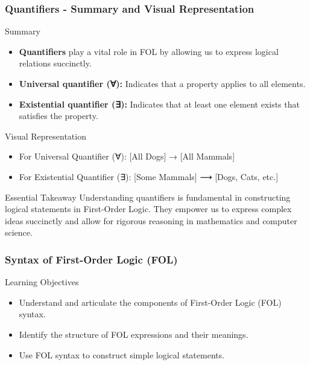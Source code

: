 \documentclass[aspectratio=169]{beamer}
\begin{document}
\begin{frame}[fragile]
    \frametitle{Quantifiers - Summary and Visual Representation}
    \begin{block}{Summary}
        \begin{itemize}
            \item \textbf{Quantifiers} play a vital role in FOL by allowing us to express logical relations succinctly.
            \item \textbf{Universal quantifier (∀):} Indicates that a property applies to all elements.
            \item \textbf{Existential quantifier (∃):} Indicates that at least one element exists that satisfies the property.
        \end{itemize}
    \end{block}

    \begin{block}{Visual Representation}
        \begin{itemize}
            \item For Universal Quantifier (∀): [All Dogs] → [All Mammals]
            \item For Existential Quantifier (∃): [Some Mammals] ⟶ [Dogs, Cats, etc.]
        \end{itemize}
    \end{block}

    \begin{block}{Essential Takeaway}
        Understanding quantifiers is fundamental in constructing logical statements in First-Order Logic. They empower us to express complex ideas succinctly and allow for rigorous reasoning in mathematics and computer science.
    \end{block}
\end{frame}

\begin{frame}[fragile]
    \frametitle{Syntax of First-Order Logic (FOL)}
    \begin{block}{Learning Objectives}
        \begin{itemize}
            \item Understand and articulate the components of First-Order Logic (FOL) syntax.
            \item Identify the structure of FOL expressions and their meanings.
            \item Use FOL syntax to construct simple logical statements.
        \end{itemize}
    \end{block}
\end{frame}
\end{document}
